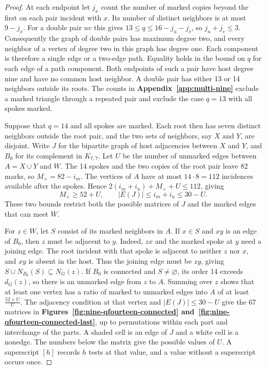\begin{proof}
At each endpoint let $j_x$ count the number of marked copies beyond
the first on each pair incident with $x$. Its number of distinct
neighbors is at most $9-j_x$. For a double pair $uv$ this gives
$13\leq q\leq16-j_u-j_v$, so $j_u+j_v\leq3$.
Consequently the graph of double pairs has maximum degree two, and
every neighbor of a vertex of degree two in this graph has degree
one. Each component is therefore a single edge or a two-edge path.
Equality holds in the bound on $q$ for each edge of a path component.
Both endpoints of such a pair have host degree nine and have no
common host neighbor. A double pair has either 13 or 14 neighbors
outside its roots. The counts in \textbf{Appendix~\ref{app:multi-nine}}
exclude a marked triangle through a repeated pair and exclude the
case $q=13$ with all spokes marked.

Suppose that $q=14$ and all spokes are marked. Each root then has
seven distinct neighbors outside the root pair, and the two sets of
neighbors, say $X$ and $Y$, are disjoint. Write $J$ for the bipartite
graph of host adjacencies between $X$ and $Y$, and $B_0$ for its
complement in $K_{7,7}$. Let $U$ be the number of unmarked edges
between $A=X\cup Y$ and $W$. The 14 spokes and the two copies of the
root pair leave $82$ marks, so $M_\times=82-i_m$. The vertices of
$A$ have at most $14\cdot 8=112$ incidences available after the spokes.
Hence $2(i_m+i_u)+M_\times+U\le112$, giving
\[
 M_\times\geq52+U,\qquad |E(J)|\le i_m+i_u\leq30-U .
\]
These two bounds restrict both the possible matrices of $J$ and the
marked edges that can meet $W$.

For $z\in W$, let $S$ consist of its marked neighbors in $A$.
If $x\in S$ and $xy$ is an edge of $B_0$, then $z$ must be adjacent
to $y$. Indeed, $zx$ and the marked spoke at $y$ need a joining
edge. The root incident with that spoke is adjacent to neither $z$
nor $x$, and $xy$ is absent in the host. Thus the joining edge must
be $zy$, giving $S\cup N_{B_0}(S)\subseteq N_G(z)$.
If $B_0$ is connected and $S\ne\varnothing$, its order 14 exceeds
$d_G(z)$, so there is an unmarked edge from $z$ to $A$. Summing over
$z$ shows that at least one vertex has a ratio of marked to unmarked
edges into $A$ of at least $\frac{52+U}{U}$. The adjacency condition
at that vertex and $|E(J)|\leq30-U$ give the 67 matrices in
\textbf{Figures~\ref{fig:nine-qfourteen-connected}
and~\ref{fig:nine-qfourteen-connected-last}}, up to permutations within
each part and interchange of the parts. A shaded cell is an edge of
$J$ and a white cell is a nonedge. The numbers below the matrix give
the possible values of $U$. A superscript $[h]$ records $h$ tests
at that value, and a value without a superscript occurs once.


\end{proof}
